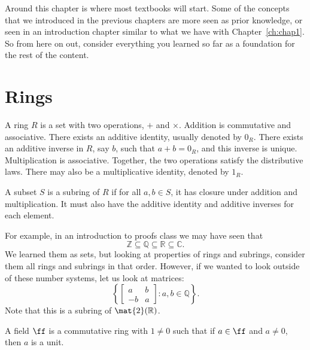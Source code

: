 
Around this chapter is where most textbooks will start.
Some of the concepts that we introduced in the previous chapters are more seen as prior knowledge, or seen in an introduction chapter similar to what we have with Chapter~\ref{ch:chap1}.
So from here on out, consider everything you learned so far as a foundation for the rest of the content.

\section{Rings}

\begin{definition}[Ring]
    A ring $R$ is a set with two operations, $+$ and $\times$.
    Addition is commutative and associative.
    There exists an additive identity, usually denoted by $0_R$.
    There exists an additive inverse in $R$, say $b$, such that $a+b=0_R$, and this inverse is unique.
    Multiplication is associative.
    Together, the two operations satisfy the distributive laws.
    There may also be a multiplicative identity, denoted by $1_R$.
\end{definition}

\begin{definition}[Subrings]
    A subset $S$ is a subring of $R$ if for all $a,b\in S$, it has closure under addition and multiplication.
    It must also have the additive identity and additive inverses for each element.
\end{definition}

For example, in an introduction to proofs class we may have seen that
\[
    \mathbb{Z}\subseteq\mathbb{Q}\subseteq\mathbb{R}\subseteq\mathbb{C}.
\]
We learned them as sets, but looking at properties of rings and subrings, consider them all rings and subrings in that order.
However, if we wanted to look outside of these number systems, let us look at matrices:
\[
    \left\{
        \begin{bmatrix}
            a&b\\
            -b&a
        \end{bmatrix}
        :a,b\in\mathbb{Q}
    \right\}.
\]
Note that this is a subring of $\mat{2}(\mathbb{R})$.

\begin{definition}[Field]
    A field $\ff$ is a commutative ring with $1\neq 0$ such that if $a\in\ff$ and $a\neq 0$, then $a$ is a unit.
\end{definition}


